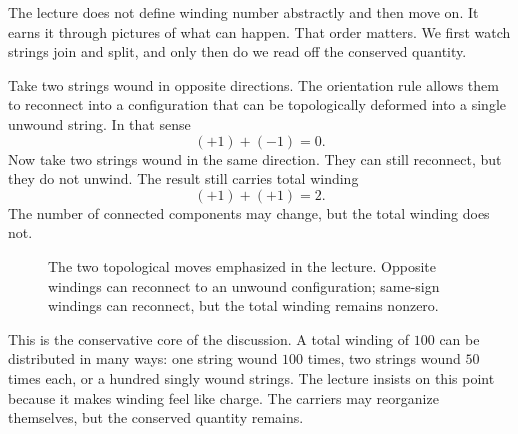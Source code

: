 The lecture does not define winding number abstractly and then move on. It earns it through pictures of what can happen. That order matters. We first watch strings join and split, and only then do we read off the conserved quantity.

Take two strings wound in opposite directions. The orientation rule allows them to reconnect into a configuration that can be topologically deformed into a single unwound string. In that sense
\begin{equation}
(+1)+(-1)=0.
\end{equation}
Now take two strings wound in the same direction. They can still reconnect, but they do not unwind. The result still carries total winding
\begin{equation}
(+1)+(+1)=2.
\end{equation}
The number of connected components may change, but the total winding does not.

\begin{figure}[htbp]
\centering
{}
\caption{The two topological moves emphasized in the lecture. Opposite windings can reconnect to an unwound configuration; same-sign windings can reconnect, but the total winding remains nonzero.}
\end{figure}

This is the conservative core of the discussion. A total winding of \(100\) can be distributed in many ways: one string wound \(100\) times, two strings wound \(50\) times each, or a hundred singly wound strings. The lecture insists on this point because it makes winding feel like charge. The carriers may reorganize themselves, but the conserved quantity remains.

